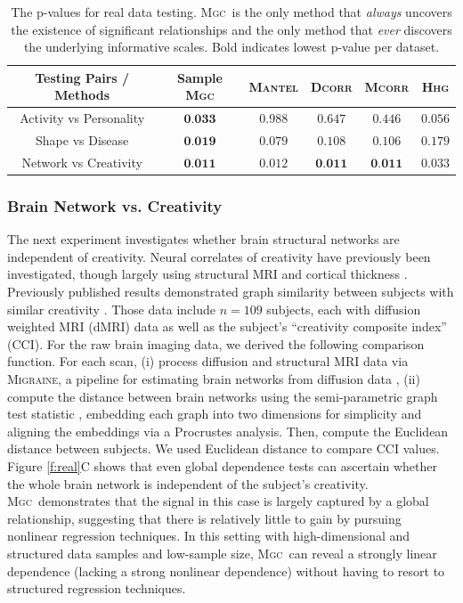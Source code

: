 \documentclass[11pt]{article}
\providecommand{\sct}[1]{{\normalfont\textsc{#1}}}
\newcommand{\Migraine}{\sct{Migraine}}
\newcommand{\Mgc}{\sct{Mgc}}
\newcommand{\Hhg}{\sct{Hhg}}
\newcommand{\Dcorr}{\sct{Dcorr}}
\newcommand{\Mcorr}{\sct{Mcorr}}
\newcommand{\Mantel}{\sct{Mantel}}
\begin{document}
\begin{table}[htbp]
\centering
\caption{The p-values for real data testing. \Mgc~is the only method that \emph{always} uncovers the existence of significant relationships and the only method that \emph{ever} discovers the underlying informative scales. Bold indicates lowest p-value per dataset.}
\label{t:real}%
\begin{tabular}{|c||c|c|c|c|c|}
\hline
Testing Pairs / Methods & Sample \Mgc & \Mantel & \Dcorr & \Mcorr & \Hhg \\
\hline
Activity vs Personality & $\textbf{0.033}$  & $0.988$ & $0.647$ & $0.446$ & $0.056$ \\
\hline
Shape vs Disease & $\textbf{0.019}$  & $0.079$ & $0.108$ & $0.106$ & $0.179$ \\
\hline
Network vs Creativity & $\textbf{0.011}$  & ${0.012}$ & $\textbf{0.011}$ & $\textbf{0.011}$ & ${0.033}$ \\
\hline
\end{tabular}
\end{table}

\subsubsection*{Brain Network vs. Creativity}

The next experiment investigates whether brain structural networks are independent of creativity.  Neural correlates of creativity have previously been investigated, though largely using structural MRI and cortical thickness \cite{Jung2009}.  Previously published results demonstrated graph similarity between subjects with similar creativity \cite{Koutra15a}. Those data include  $n=109$ subjects, each with diffusion weighted MRI (dMRI) data as well as the subject's ``creativity composite index'' (CCI).  
For the raw brain imaging data, we derived the following comparison function.  For each scan, (i) process diffusion and structural MRI data via  \Migraine, a pipeline for estimating brain networks from diffusion data \cite{GrayRoncal2013}, (ii) 
compute the distance between brain networks using the semi-parametric graph test statistic \cite{Sussman2013,ShenVogelsteinPriebe2016,Tang2016}, embedding each graph into two dimensions for simplicity and aligning the embeddings via a Procrustes analysis.  Then, compute the Euclidean distance between subjects. We used Euclidean distance to compare CCI values. 
% 
Figure \ref{f:real}{\color{magenta}C} shows that even global dependence tests can ascertain whether the whole brain network is independent of the subject's creativity.  \Mgc~demonstrates that the signal in this case is largely captured by a global relationship, suggesting that there is relatively little to gain by pursuing nonlinear regression techniques. In this setting with high-dimensional and structured data samples and low-sample size, \Mgc~can reveal a strongly linear dependence (lacking a strong nonlinear dependence) without having to resort to structured regression techniques.
\end{document}
